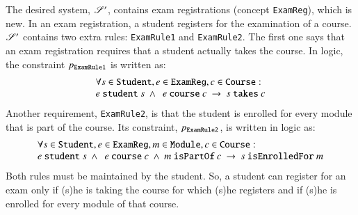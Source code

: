 \documentclass{elsarticle}
\begin{document}
   The desired system, $\mathscr{S}'$, contains exam registrations (concept \verb-ExamReg-), which is new.
   In an exam registration, a student registers for the examination of a course.
   $\mathscr{S}'$ contains two extra rules: \verb-ExamRule1- and \verb-ExamRule2-.
   The first one says that an exam registration requires that a student actually takes the course.
   In logic, the constraint $p_{\tt ExamRule1}$ is written as:
\[\begin{array}{l}\forall s\in\text{\tt Student}, e\in\text{\tt ExamReg}, c\in\text{\tt Course}:\\
   e\ \text{\tt student}\ s\ \wedge\ \ e\ \text{\tt course}\ c\ \rightarrow\ s\ \text{\tt takes}\ c\\
\end{array}\]
   Another requirement, \verb-ExamRule2-, is that the student is enrolled for every module that is part of the course.
   Its constraint, $p_{\tt ExamRule2}$, is written in logic as:
\[\begin{array}{l}\forall s\in\text{\tt Student}, e\in\text{\tt ExamReg}, m\in\text{\tt Module}, c\in\text{\tt Course}:\\
   e\ \text{\tt student}\ s\ \wedge\ \ e\ \text{\tt course}\ c\ \wedge\ m\ \text{\tt isPartOf}\ c\ \rightarrow\ s\ \text{\tt isEnrolledFor}\ m
\end{array}\]
   Both rules must be maintained by the student.
   So, a student can register for an exam only if (s)he is taking the course for which (s)he registers and if (s)he is enrolled for every module of that course.
\end{document}
